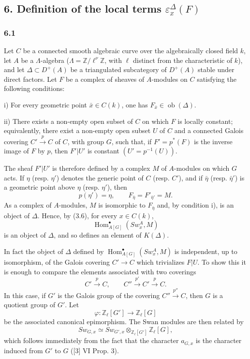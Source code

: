 \documentclass[11pt]{article}
\DeclareMathOperator{\Hom}{Hom}
\providecommand{\Ob}{\operatorname{ob}}
\providecommand{\Hom}{\operatorname{Hom}}
\providecommand{\Ob}{\operatorname{ob}}
\providecommand{\Ob}{\operatorname{Ob}}
\begin{document}
\subsection*{6. Definition of the local terms $\varepsilon_x^\Delta(F)$}

\subsubsection*{6.1}

Let $C$ be a connected smooth algebraic curve over the algebraically closed field $k$, let $A$ be a $\Lambda$-algebra ($\Lambda=\mathbb Z/\ell^\nu\mathbb Z$, with $\ell$ distinct from the characteristic of $k$), and let $\Delta\subset D^+(A)$ be a triangulated subcategory of $D^+(A)$ stable under direct factors. Let $F$ be a complex of sheaves of $A$-modules on $C$ satisfying the following conditions:

i) For every geometric point $\bar x\in C(k)$, one has $F_{\bar x}\in\Ob(\Delta)$.

ii) There exists a non-empty open subset of $C$ on which $F$ is locally constant; equivalently, there exist a non-empty open subset $U$ of $C$ and a connected Galois covering $C'\xrightarrow{p}C$ of $C$, with group $G$, such that, if $F'=p^*(F)$ is the inverse image of $F$ by $p$, then $F'|U'$ is constant $(U'=p^{-1}(U))$.

The sheaf $F'|U'$ is therefore defined by a complex $M$ of $A$-modules on which $G$ acts. If $\eta$ (resp. $\eta'$) denotes the generic point of $C$ (resp. $C'$), and if $\bar\eta$ (resp. $\bar\eta'$) is a geometric point above $\eta$ (resp. $\eta'$), then
\[
p(\eta')=\eta,\qquad
F_{\bar\eta}=F'_{\bar\eta'}=M.
\tag{6.1.1}
\]
As a complex of $A$-modules, $M$ is isomorphic to $F_{\bar\eta}$ and, by condition i), is an object of $\Delta$. Hence, by (3.6), for every $x\in C(k)$,
\[
\Hom^\bullet_{A[G]}(Sw_x^A,M)
\]
is an object of $\Delta$, and so defines an element of $K(\Delta)$.

In fact the object of $\Delta$ defined by $\Hom^\bullet_{A[G]}(Sw_x^A,M)$ is independent, up to isomorphism, of the Galois covering $C'\to C$ which trivializes $F|U$. To show this it is enough to compare the elements associated with two coverings
\[
C'\xrightarrow{p}C,\qquad C''\xrightarrow{p'}C'\xrightarrow{p}C.
\]
In this case, if $G'$ is the Galois group of the covering $C''\xrightarrow{p''}C$, then $G$ is a quotient group of $G'$. Let
\[
\varphi:\mathbb Z_\ell[G']\longrightarrow \mathbb Z_\ell[G]
\]
be the associated canonical epimorphism. The Swan modules are then related by
\[
Sw_{G,x}\simeq Sw_{G',x}\otimes_{\mathbb Z_\ell[G']}\mathbb Z_\ell[G],
\]
which follows immediately from the fact that the character $a_{G,x}$ is the character induced from $G'$ to $G$ ([3] VI Prop. 3).
\end{document}
